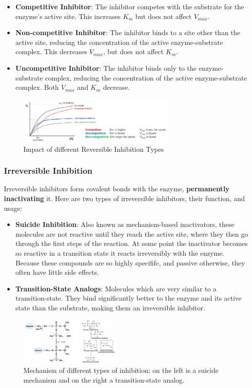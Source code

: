\documentclass[../main.tex]{subfiles}
\begin{document}
\begin{itemize}
	\item \textbf{\gls{Competitive Inhibitor}}: The inhibitor competes with the substrate for the enzyme's active site. This increases $K_{m}$ but does not affect $V_{max}$.
	\item \textbf{\gls{Non-competitive Inhibitor}}: The inhibitor binds to a site other than the active site, reducing the concentration of the active enzyme-substrate complex. This decreases $V_{max}$, but does not affect $K_{m}$.
	\item\textbf{\gls{Uncompetitive Inhibitor}}: The inhibitor binds only to the enzyme-substrate complex, reducing the concentration of the active enzyme-substrate complex. Both $V_{max}$ and $K_{m}$ decrease.
\end{itemize}

\begin{figure}[h]
	\centering
	\includegraphics[width=0.7\textwidth]{reversible_MM}
	\caption{Impact of different Reversible Inhibition Types}
\end{figure}


\subsubsection{\gls{Irreversible Inhibition}}
Irreversible inhibitors form covalent bonds with the enzyme, \textbf{permanently inactivating} it.
Here are two types of irreversible inhibitors, their function, and usage:
\begin{itemize}
	\item \textbf{\gls{Suicide Inhibition}}: Also known as mechanism-based inactivators, these molecules are not reactive until they reach the active site, where they then go through the first steps of the reaction. At some point the inactivator becomes so reactive in a transition state it reacts irreversibly with the enzyme. Because these compounds are so highly specififc, and passive otherwise, they often have little side effects.
	\item \textbf{\gls{Transition-State Analogs}}: Molecules which are very similar to a transition-state. They bind significantly better to the enzyme and its active state than the substrate, making them an irreversible inhibitor.
\end{itemize}

\begin{figure}[h]
	\centering
	\includegraphics[width=0.45\textwidth]{Irreversible}
	\caption{Mechanism of different types of inhibition; on the left is a suicide mechanism and on the right a transition-state analog.}
\end{figure}
\end{document}
